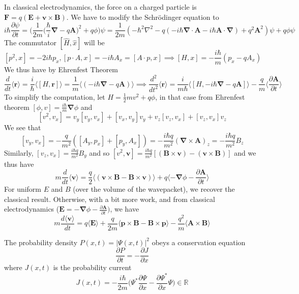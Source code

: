 \documentclass[a4paper]{article}
\begin{document}
\begin{eg}
In classical electrodynamics, the force on a charged particle is $\mathbf{F}=q(\mathbf{E}+\mathbf{v}\times\mathbf{B})$. We have to modify the Schr\"{o}dinger equation to
$$i\hbar\frac{\partial\psi}{\partial t}=\bigg(\frac{1}{2m}\bigg(\frac{\hbar}{i}\boldsymbol{\nabla}-q\mathbf{A}\bigg)^2+q\phi\bigg)\psi=\frac{1}{2m}(-\hbar^2\nabla^2-q(-i\hbar\boldsymbol{\nabla}\cdot\mathbf{A}-i\hbar\mathbf{A}\cdot\boldsymbol{\nabla})+q^2\mathbf{A}^2)\psi+q\phi\psi$$
The commutator $[\hat{H},\hat{x}]$ will be
$$[p^2,x]=-2i\hbar p_x,[p\cdot A,x]=-i\hbar A_x=[A\cdot p,x]\implies[H,x]=-\frac{i\hbar}{m}(p_x-qA_x)$$
We thus have by Ehrenfest Theorem
$$\frac{d}{dt}\langle\mathbf{r}\rangle=\frac{i}{\hbar}\langle[H,\mathbf{r}]\rangle=\frac{1}{m}\langle(-i\hbar\boldsymbol{\nabla}-q\mathbf{A})\rangle\implies\frac{d^2}{dt^2}\langle\mathbf{r}\rangle=\frac{i}{m\hbar}\langle[H,-i\hbar\boldsymbol{\nabla}-q\mathbf{A}]\rangle-\frac{q}{m}\langle\frac{\partial\mathbf{A}}{\partial t}\rangle
$$
To simplify the computation, let $H=\frac{1}{2}mv^2+q\phi$, in that case from Ehrenfest theorem $[\phi,v]=\frac{i\hbar}{m}\boldsymbol{\nabla}\phi$ and
$$[v^2,v_x]=v_y[v_y,v_x]+[v_x,v_y]v_y+v_z[v_z,v_x]+[v_z,v_x]v_z$$
We see that
$$[v_y,v_x]=-\frac{q}{m^2}([A_y,p_x]+[p_y,A_x])=-\frac{i\hbar q}{m^2}(\boldsymbol{\nabla}\times\mathbf{A})_z=-\frac{i\hbar q}{m^2}B_z$$
Similarly, $[v_z,v_x]=\frac{i\hbar q}{m^2}B_y$ and so 
$[v^2,\mathbf{v}]=\frac{i\hbar q}{m^2}[(\mathbf{B}\times\mathbf{v})-(\mathbf{v}\times\mathbf{B})]$ and we thus have
$$m\frac{d}{dt}\langle\mathbf{v}\rangle=\frac{q}{2}\langle(\mathbf{v}\times\mathbf{B}-\mathbf{B}\times\mathbf{v})\rangle+q\langle-\boldsymbol{\nabla}\phi-\frac{\partial\mathbf{A}}{\partial t}\rangle$$
For uniform $E$ and $B$ (over the volume of the wavepacket), we recover the classical result. Otherwise, with a bit more work, and from classical electrodynamics ($\mathbf{E}=-\boldsymbol{\nabla}\phi-\frac{\partial\mathbf{A}}{\partial t})$, we have
$$m\frac{d\langle\mathbf{v}\rangle}{dt}=q\langle\mathbf{E}\rangle+\frac{q}{2m}\langle\mathbf{p}\times\mathbf{B}-\mathbf{B}\times\mathbf{p}\rangle-\frac{q^2}{m}\langle\mathbf{A}\times\mathbf{B}\rangle$$
\end{eg}
\begin{prop}
The probability density $P(x,t)=|\Psi(x,t)|^2$ obeys a conservation equation
$$\frac{\partial P}{\partial t}=-\frac{\partial J}{\partial x}$$
where $J(x,t)$ is the probability current
$$J(x,t)=-\frac{i\hbar}{2m}\bigg(\Psi^*\frac{\partial\Psi}{\partial x}-\frac{\partial\Psi^*}{\partial x}\Psi\bigg)\in\mathbb{R}$$
\end{prop}
\end{document}
